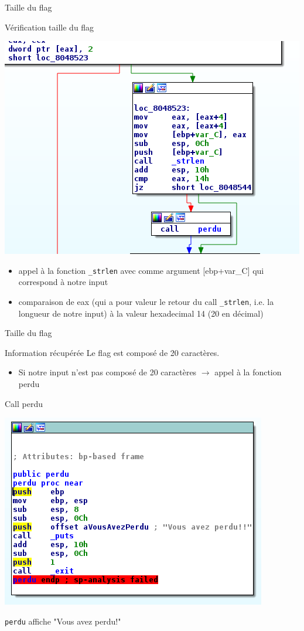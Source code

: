\documentclass[10pt,sans,usenames,dvipsnames,french,compress]{beamer}
\begin{document}
\begin{frame}[fragile]{Taille du flag}
	\begin{block}{Vérification taille du flag}
		\begin{center}
			\includegraphics[width=0.5\linewidth]{114/lenght.png}
		\end{center}
	\end{block}

	\begin{exampleblock}{}
		\begin{itemize}
			\item appel à la fonction \texttt{\_strlen} avec comme argument [ebp+var\_C] qui correspond à notre input
			\item comparaison de eax (qui a pour valeur le retour du call \texttt{\_strlen}, i.e. la longueur de notre input) à la valeur hexadecimal 14 (20 en décimal)
		\end{itemize}
	\end{exampleblock}
\end{frame}

\begin{frame}[fragile]{Taille du flag}
	\begin{block}{Information récupérée}
		Le flag est composé de 20 caractères.
	\end{block}

	\begin{exampleblock}{}
		\begin{itemize}
			\item Si notre input n'est pas composé de 20 caractères $ \rightarrow $ appel à la fonction perdu
		\end{itemize}
	\end{exampleblock}
\end{frame}

\begin{frame}[fragile]{Call perdu}
 	\begin{center}
		\includegraphics[width=0.5\linewidth]{114/perdu.png}
	\end{center}

	\begin{block}{}
		\texttt{perdu} affiche "Vous avez perdu!"
	\end{block}
\end{frame}
\end{document}
